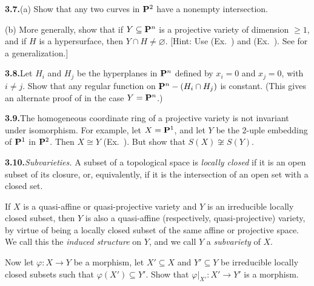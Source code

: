 {\smallskip
\noindent\hypertarget{ex-I-3.7}{}\textbf{3.7.}\enspace (a) Show that any two curves in $\mathbf{P}^2$ have a nonempty intersection.

(b) More generally, show that if $Y\subseteq\mathbf{P}^n$ is a projective variety of dimension $\geqslant1$, and if $H$ is a hypersurface, then $Y\cap H\ne\varnothing$. [Hint: Use (Ex.~) and (Ex.~). See  for a generalization.]

\smallskip
\noindent\hypertarget{ex-I-3.8}{}\textbf{3.8.}\enspace Let $H_i$ and $H_j$ be the hyperplanes in $\mathbf{P}^n$ defined by $x_i=0$ and $x_j=0$, with $i\ne j$. Show that any regular function on $\mathbf{P}^n-(H_i\cap H_j)$ is constant. (This gives an alternate proof of  in the case $Y=\mathbf{P}^n$.)

\smallskip
\noindent\hypertarget{ex-I-3.9}{}\textbf{3.9.}\enspace The homogeneous coordinate ring of a projective variety is not invariant under isomorphism. For example, let $X=\mathbf{P}^1$, and let $Y$ be the $2$-uple embedding of $\mathbf{P}^1$ in $\mathbf{P}^2$. Then $X\cong Y$ (Ex.~). But show that $S(X)\not\cong S(Y)$.

\smallskip
\noindent\hypertarget{ex-I-3.10}{}\textbf{3.10.}\enspace \emph{Subvarieties.} A subset of a topological space is \emph{locally closed} if it is an open subset of its closure, or, equivalently, if it is the intersection of an open set with a closed set.

If $X$ is a quasi-affine or quasi-projective variety and $Y$ is an irreducible locally closed subset, then $Y$ is also a quasi-affine (respectively, quasi-projective) variety, by virtue of being a locally closed subset of the same affine or projective space. We call this the \emph{induced structure} on $Y$, and we call $Y$ a \emph{subvariety} of $X$.

Now let $\varphi\colon X\to Y$ be a morphism, let $X'\subseteq X$ and $Y'\subseteq Y$ be irreducible locally closed subsets such that $\varphi(X')\subseteq Y'$. Show that $\varphi|_{X'}\colon X'\to Y'$ is a morphism.%
}
